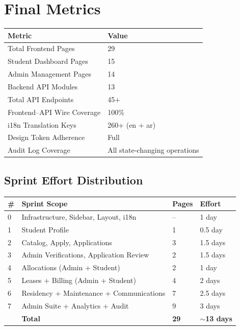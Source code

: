\documentclass[12pt,a4paper]{article}
\begin{document}
\section{Final Metrics}

\begin{longtable}{p{6cm}p{3cm}}
\toprule
\textbf{Metric} & \textbf{Value} \\
\midrule
Total Frontend Pages & 29 \\
Student Dashboard Pages & 15 \\
Admin Management Pages & 14 \\
Backend API Modules & 13 \\
Total API Endpoints & 45+ \\
Frontend--API Wire Coverage & 100\% \\
i18n Translation Keys & 260+ (en + ar) \\
Design Token Adherence & Full \\
Audit Log Coverage & All state-changing operations \\
\bottomrule
\end{longtable}

\subsection{Sprint Effort Distribution}

\begin{longtable}{p{1cm}p{6cm}p{2cm}p{2cm}}
\toprule
\textbf{\#} & \textbf{Sprint Scope} & \textbf{Pages} & \textbf{Effort} \\
\midrule
0 & Infrastructure, Sidebar, Layout, i18n & -- & 1 day \\
1 & Student Profile & 1 & 0.5 day \\
2 & Catalog, Apply, Applications & 3 & 1.5 days \\
3 & Admin Verifications, Application Review & 2 & 1.5 days \\
4 & Allocations (Admin + Student) & 2 & 1 day \\
5 & Leases + Billing (Admin + Student) & 4 & 2 days \\
6 & Residency + Maintenance + Communications & 7 & 2.5 days \\
7 & Admin Suite + Analytics + Audit & 9 & 3 days \\
\midrule
& \textbf{Total} & \textbf{29} & \textbf{$\sim$13 days} \\
\bottomrule
\end{longtable}
\end{document}
